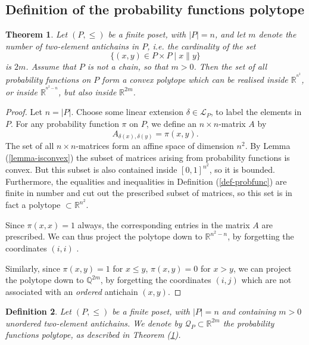 \documentclass[11pt,a4paper,abstract=yes]{scrartcl}
\theoremstyle{plain}
\newtheorem{theorem}{Theorem}[section]
\newtheorem{definition}[theorem]{Definition}
\newcommand{\QQ}{\mathbb{Q}}
\newcommand{\RR}{\mathbb{R}}
\newcommand{\linexts}[1]{\mathcal{L}_{#1}}
\newcommand{\prpolytope}[1]{\mathcal{Q}_{#1}}
\begin{document}
\subsection{Definition of the probability functions polytope}
\label{sec:org688a90e}
\begin{theorem}
Let \((P,\le)\) be a finite poset, with \(|P|=n\), and let \(m\) denote the number of
two-element antichains in \(P\), i.e. the cardinality of the set
\[
\{(x,y) \in P \times P \mid x \parallel y\}
\]
is \(2m\). Assume that \(P\) is not a chain, so that \(m > 0\).
Then the set of all probability functions on \(P\)
form a convex polytope which can be realised inside
\(\RR^{^{n^{2}}}\), or inside \(\RR^{^{n^{2}-n}}\),
but also inside \(\RR^{2m}\).
\label{thm-embedd}
\end{theorem}
\begin{proof}
Let \(n = |P|\). Choose some linear extension \(\delta \in \linexts{P}\),
to label the elements in \(P\). For any probability function \(\pi\) on \(P\),
we define an \(n \times n\)-matrix \(A\) by
\[A_{{\delta(x),\delta(y)}} = \pi(x,y).\]
The set of all \(n \times n\)-matrices form an affine space of dimension \(n^{2}\).
By Lemma (\ref{lemma-isconvex}) the subset of matrices arising from
probability functions is convex. But this subset is also contained inside \([0,1]^{n^{2}}\), so it is
bounded. Furthermore, the equalities and inequalities in Definition (\ref{def-probfunc})
are finite in number and cut out the prescribed subset of matrices, so this set
is in fact a polytope \(\subset \RR^{n^{2}}\).

Since \(\pi(x,x)=1\) always, the
corresponding entries in the matrix \(A\) are prescribed. We can thus
project the polytope down to \(\RR^{n^{2} - n}\), by forgetting the coordinates \((i,i)\) .

Similarly, since \(\pi(x,y)=1\) for \(x \le y\), \(\pi(x,y)=0\) for \(x > y\),
we can project the polytope down to \(\QQ^{2m}\), by forgetting the coordinates \((i,j)\) which are not associated
with an \emph{ordered} antichain  \((x,y)\).
\end{proof}


\begin{definition}
Let \((P,\le)\) be a finite poset, with \(|P|=n\)  and containing \(m>0\) \emph{unordered} two-element antichains.
We denote by \(\prpolytope{P} \subset \RR^{2m}\) the probability functions polytope, as described in Theorem (\ref{thm-embedd}).
\end{definition}
\end{document}
